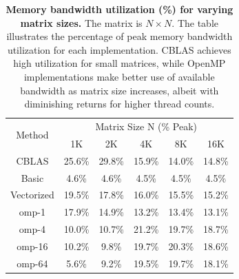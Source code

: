 \begin{table}[h!]
\centering
\begin{tabular}{|c|c|c|c|c|c|}
\hline
\multirow{2}{*}{Method} & \multicolumn{5}{c|}{Matrix Size N (\% Peak)} \\ \cline{2-6} 
                        & 1K      & 2K      & 4K      & 8K      & 16K     \\ \hline
CBLAS                   & 25.6\%  & 29.8\%  & 15.9\%  & 14.0\%  & 14.8\%  \\ \hline
Basic                   & 4.6\%   & 4.6\%   & 4.5\%   & 4.5\%   & 4.5\%   \\ \hline
Vectorized              & 19.5\%  & 17.8\%  & 16.0\%  & 15.5\%  & 15.2\%  \\ \hline
omp-1                   & 17.9\%  & 14.9\%  & 13.2\%  & 13.4\%  & 13.1\%  \\ \hline
omp-4                   & 10.0\%  & 10.7\%  & 21.2\%  & 19.7\%  & 18.7\%  \\ \hline
omp-16                  & 10.2\%  & 9.8\%   & 19.7\%  & 20.3\%  & 18.6\%  \\ \hline
omp-64                  & 5.6\%   & 9.2\%   & 19.5\%  & 19.7\%  & 18.1\%  \\ \hline
\end{tabular}
\caption{\textbf{Memory bandwidth utilization (\%) for varying matrix sizes.} The matrix is \(N \times N\). The table illustrates the percentage of peak memory bandwidth utilization for each implementation. CBLAS achieves high utilization for small matrices, while OpenMP implementations make better use of available bandwidth as matrix size increases, albeit with diminishing returns for higher thread counts.}
\label{tab:memory-bandwidth-utilizatoin-percentage}
\end{table}
